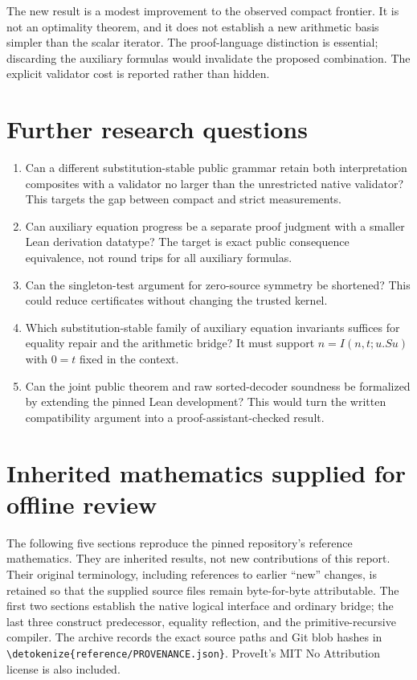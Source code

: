 \documentclass[11pt,letterpaper]{article}
\theoremstyle{definition}\newtheorem{definition}[theorem]{Definition}
\theoremstyle{remark}\newtheorem{remark}[theorem]{Remark}
\newcommand{\file}[1]{\expandafter\nolinkurl\expandafter{\detokenize{#1}}}
\begin{document}
The new result is a modest improvement to the observed compact frontier.
It is not an optimality theorem, and it does not establish a new arithmetic
basis simpler than the scalar iterator. The proof-language distinction is
essential; discarding the auxiliary formulas would invalidate the proposed
combination. The explicit validator cost is reported rather than hidden.

\section{Further research questions}

\begin{enumerate}
\item Can a different substitution-stable public grammar retain both
interpretation composites with a validator no larger than the unrestricted
native validator? This targets the gap between compact and strict measurements.
\item Can auxiliary equation progress be a separate proof judgment with a
smaller Lean derivation datatype? The target is exact public consequence
equivalence, not round trips for all auxiliary formulas.
\item Can the singleton-test argument for zero-source symmetry be shortened?
This could reduce certificates without changing the trusted kernel.
\item Which substitution-stable family of auxiliary equation invariants
suffices for equality repair and the arithmetic bridge? It must support
$n=I(n,t;u.Su)$ with $0=t$ fixed in the context.
\item Can the joint public theorem and raw sorted-decoder soundness be
formalized by extending the pinned Lean development? This would turn the
written compatibility argument into a proof-assistant-checked result.
\end{enumerate}

\clearpage
\appendix
\section*{Inherited mathematics supplied for offline review}
The following five sections reproduce the pinned repository's reference
mathematics. They are inherited results, not new contributions of this
report. Their original terminology, including references to earlier
``new'' changes, is retained so that the supplied source files remain
byte-for-byte attributable. The first two sections establish the native
logical interface and ordinary bridge; the last three construct
predecessor, equality reflection, and the primitive-recursive compiler.
The archive records the exact source paths and Git blob hashes in
\file{reference/PROVENANCE.json}. ProveIt's MIT No Attribution license is
also included.
\end{document}
